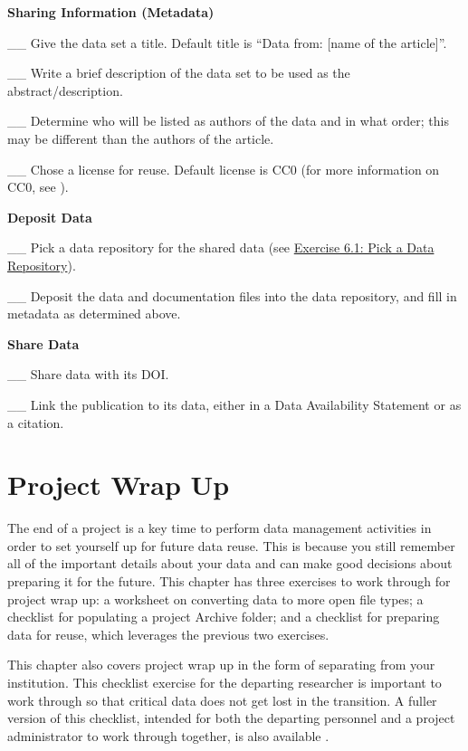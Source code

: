 \documentclass[
]{book}
\begin{document}
\textbf{Sharing Information (Metadata)}

\_\_ Give the data set a title. Default title is ``Data from: {[}name of the article{]}''.

\_\_ Write a brief description of the data set to be used as the abstract/description.

\_\_ Determine who will be listed as authors of the data and in what order; this may be different than the authors of the article.

\_\_ Chose a license for reuse. Default license is CC0 (for more information on CC0, see \citep{creative_commons_wiki_cc0_2014}).

\textbf{Deposit Data}

\_\_ Pick a data repository for the shared data (see \protect\hyperlink{data-repository}{Exercise 6.1: Pick a Data Repository}).

\_\_ Deposit the data and documentation files into the data repository, and fill in metadata as determined above.

\textbf{Share Data}

\_\_ Share data with its DOI.

\_\_ Link the publication to its data, either in a Data Availability Statement or as a citation.

\hypertarget{project-wrap-up}{%
\chapter{Project Wrap Up}\label{project-wrap-up}}

The end of a project is a key time to perform data management activities in order to set yourself up for future data reuse. This is because you still remember all of the important details about your data and can make good decisions about preparing it for the future. This chapter has three exercises to work through for project wrap up: a worksheet on converting data to more open file types; a checklist for populating a project Archive folder; and a checklist for preparing data for reuse, which leverages the previous two exercises.

This chapter also covers project wrap up in the form of separating from your institution. This checklist exercise for the departing researcher is important to work through so that critical data does not get lost in the transition. A fuller version of this checklist, intended for both the departing personnel and a project administrator to work through together, is also available \citep{goben_data_2023}.
\end{document}
